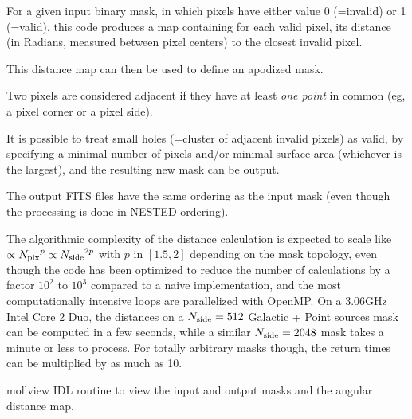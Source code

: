 \begin{codedescription}
{For a given input binary mask, in which pixels have either value 0 (=invalid) or 1 (=valid),
this code produces a map containing for each valid pixel,
its distance (in Radians, measured between pixel centers) to the closest invalid pixel.

This distance map can then be used to define an apodized mask.

Two pixels are considered adjacent if they have at least {\em one point} in common 
(eg, a pixel corner or a pixel side).

It is possible to treat small holes (=cluster of adjacent invalid pixels) as valid,
by specifying a minimal number of pixels and/or minimal surface area (whichever is the largest),
and the resulting new mask can be output.

The output FITS files have the same ordering as the input mask
(even though the processing is done in NESTED ordering).

{\small{The algorithmic complexity of the distance calculation is expected to scale like $\propto {N_{\rm pix}}^p
\propto{N_{\rm side}}^{2p}$ with $p$ in $[1.5,2]$ depending on the mask topology, even
though the code has been optimized to reduce the number of calculations by a
factor $10^2$ to $10^3$ compared to a naive implementation, and the most
computationally intensive loops are parallelized with OpenMP.
On a 3.06GHz Intel Core 2 Duo, the distances on a ${N_{\rm side}}=512$ Galactic + Point sources mask can be computed in a few
seconds, while a similar ${N_{\rm side}}=2048$ mask takes a minute or less to process.
For totally arbitrary masks though, the return times can be multiplied by as
much as 10.}}

%
}
\end{codedescription}


\begin{support}
  \begin{sulist}{} %
  \item[mollview] IDL routine to view the input and output masks and the angular
distance map.
  \end{sulist}
\end{support}


